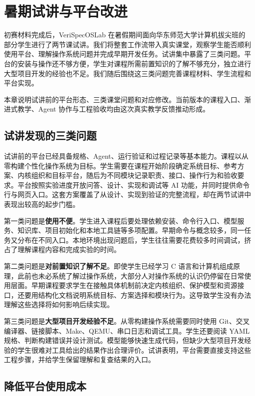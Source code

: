 \chapter{暑期试讲与平台改进}

初赛材料完成后，VeriSpecOSLab 在暑假期间面向华东师范大学计算机拔尖班的部分学生进行了两节课试讲。我们将整套工作流带入真实课堂，观察学生能否顺利使用平台、理解操作系统问题并完成早期开发任务。试讲集中暴露了三类问题。平台的安装与操作还不够方便，学生对课程所需前置知识的了解不够充分，独立进行大型项目开发的经验也不足。我们随后围绕这三类问题完善课程材料、学生流程和平台实现。

本章说明试讲前的平台形态、三类课堂问题和对应修改。当前版本的课程入口、渐进式教学、Agent 协作与工程验收均由这次真实教学反馈推动形成。

\section{试讲发现的三类问题}

试讲前的平台已经具备规格、Agent、运行验证和过程记录等基本能力。课程以从零构建个性化操作系统为目标。学生需要在课程开始阶段确定系统目标、参考方案、内核组织和目标平台，随后为不同模块记录职责、接口、操作行为和验收要求。平台按照实验进度开放问答、设计、实现和调试等 AI 功能，并同时提供命令行与网页入口。这套方案覆盖了从设计、实现到验证的完整流程，却在两节试讲中表现出较高的起步门槛。

第一类问题是\textbf{使用不便}。学生进入课程后要处理依赖安装、命令行入口、模型服务、知识库、项目初始化和本地工具链等多项配置。早期命令与概念较多，同一任务又分布在不同入口。本地环境出现问题后，学生往往需要花费较多时间调试，挤占了理解课程内容和完成实验的时间。

第二类问题是\textbf{对前置知识了解不足}。即使学生已经学习 C 语言和计算机组成原理，此前也未必系统了解过操作系统，大部分人对操作系统的认识仍停留在日常使用层面。早期课程要求学生在接触具体机制前决定内核组织、保护模型和资源接口，还要用结构化文档说明系统目标、方案选择和模块行为。这导致学生没有办法理解这些选择将如何影响后续实现。

第三类问题是\textbf{大型项目开发经验不足}。从零构建操作系统需要同时使用 Git、交叉编译器、链接脚本、Make、QEMU、串口日志和调试工具。学生还要阅读 YAML 规格、判断构建错误并设计测试。模型能够快速生成代码，但缺少大型项目开发经验的学生很难对工具给出的结果作出合理评价。试讲表明，平台需要直接支持这些工程步骤，并给学生保留理解和复查结果的入口。

\section{降低平台使用成本}

